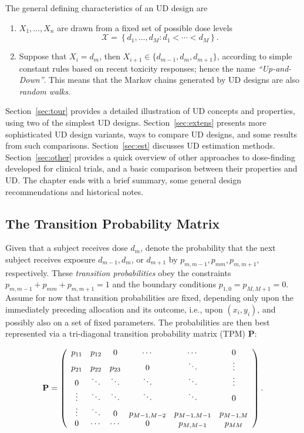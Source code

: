 The general defining characteristics of an UD design are
\begin{enumerate}
\item $X_1,\ldots,X_n$ are drawn from a fixed set of possible dose levels $$\mathcal{X} =\left\{d_1,\ldots ,d_M : d_1 <\cdots <d_M\right\}.$$
\item Suppose that $X_i=d_m$, then $X_{i+1}\in\{d_{m-1},d_m,d_{m+1}\}$, according to simple constant rules based on recent toxicity responses; hence the name \emph{``Up-and-Down''}. This means that the Markov chains generated by UD designs are also \emph{random walks}.
\end{enumerate}

Section~\ref{sec:tour} provides a detailed illustration of UD concepts and properties, using two of the simplest UD designs. Section~\ref{sec:extens} presents more sophisticated UD design variants, ways to compare UD designs, and some results from such comparisons. Section~\ref{sec:est} discusses UD estimation methods. Section~\ref{sec:other} provides a quick overview of other approaches to dose-finding developed for clinical trials, and a basic comparison between their properties and UD. The chapter ends with a brief summary, some general design recommendations and historical notes.

\subsection{The Transition Probability Matrix}\label{sec:tpm}

 Given that a subject receives dose $d_m$, denote the probability that the next subject receives exposure $d_{m-1},d_m$, or $d_{m+1}$ by $p_{m,m-1},p_{mm},p_{m,m+1}$, respectively. These  \emph{transition probabilities} obey the constraints $p_{m,m-1}+p_{mm}+p_{m,m+1}=1$ and the boundary conditions $p_{1,0}=p_{M,M+1}=0$. Assume for now that transition probabilities are fixed, depending only upon the immediately preceding allocation and its outcome, i.e., upon $\left(x_i,y_i\right)$, and possibly also on a set of fixed parameters. The probabilities are then best represented via a tri-diagonal transition probability matrix (TPM) $\mathbf{P}$:

\begin{equation}\label{eq:genericPmat}
\bf{P}=\left(
\begin{array}{cccccc}
  p_{11}& p_{12} & 0 & \cdots & \cdots & 0 \\
  p_{21} & p_{22} & p_{23} & 0 & \ddots & \vdots \\
  0 & \ddots & \ddots & \ddots & \ddots & \vdots \\
  \vdots & \ddots & \ddots & \ddots & \ddots & 0 \\
  \vdots & \ddots & 0 & p_{M-1,M-2} & p_{M-1,M-1} & p_{M-1,M} \\
  0 & \cdots & \cdots & 0 & p_{M,M-1} & p_{MM}\\
\end{array}
\right).
\end{equation}


